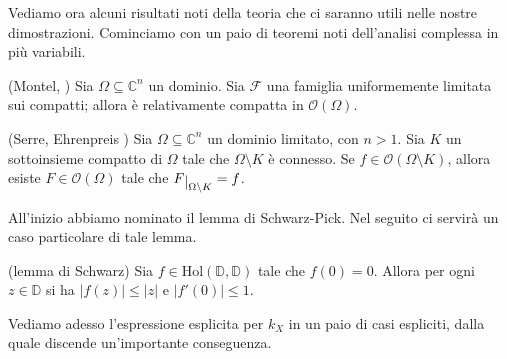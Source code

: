 Vediamo ora alcuni risultati noti della teoria che ci saranno utili nelle nostre dimostrazioni. Cominciamo con un paio di teoremi noti dell'analisi complessa in più variabili.

\begin{thm}
    (Montel, \cite[Chapter 1, Proposition 6]{N}) Sia $\Omega \subseteq \mathbb{C}^n$ un dominio. Sia $\mathcal{F}$ una famiglia uniformemente limitata sui compatti; allora è relativamente compatta in $\mathcal{O}(\Omega)$.
\end{thm}

\begin{thm} \label{hartogs_fen}
    (Serre, Ehrenpreis \cite[Chapter 1, Paragraph 1.2, Theorem 1.2.6]{Kr}) Sia $\Omega \subseteq \mathbb{C}^n$ un dominio limitato, con $n>1$. Sia $K$ un sottoinsieme compatto di $\Omega$ tale che $\Omega\setminus K$ è connesso. Se $f\in\mathcal{O}(\Omega\setminus K)$, allora esiste $F\in\mathcal{O}(\Omega)$ tale che $F\restrict{\Omega\setminus K}=f$.
\end{thm}

All'inizio abbiamo nominato il lemma di Schwarz-Pick. Nel seguito ci servirà un caso particolare di tale lemma.

\begin{lm}
    (lemma di Schwarz) Sia $f\in\text{Hol}(\mathbb{D},\mathbb{D})$ tale che $f(0)=0$. Allora per ogni $z\in\mathbb{D}$ si ha $|f(z)| \le |z|$ e $|f'(0)| \le 1$.
\end{lm}

Vediamo adesso l'espressione esplicita per $k_X$ in un paio di casi espliciti, dalla quale discende un'importante conseguenza.


